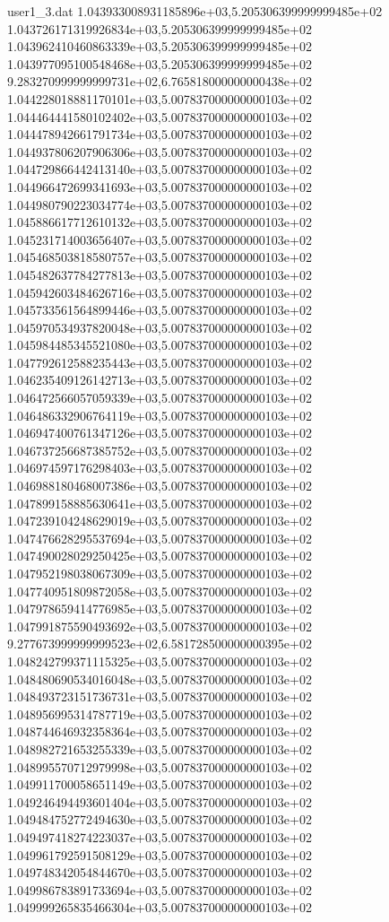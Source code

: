 \begin{filecontents}{user1_3.dat}
1.043933008931185896e+03,5.205306399999999485e+02
1.043726171319926834e+03,5.205306399999999485e+02
1.043962410460863339e+03,5.205306399999999485e+02
1.043977095100548468e+03,5.205306399999999485e+02
9.283270999999999731e+02,6.765818000000000438e+02
1.044228018881170101e+03,5.007837000000000103e+02
1.044464441580102402e+03,5.007837000000000103e+02
1.044478942661791734e+03,5.007837000000000103e+02
1.044937806207906306e+03,5.007837000000000103e+02
1.044729866442413140e+03,5.007837000000000103e+02
1.044966472699341693e+03,5.007837000000000103e+02
1.044980790223034774e+03,5.007837000000000103e+02
1.045886617712610132e+03,5.007837000000000103e+02
1.045231714003656407e+03,5.007837000000000103e+02
1.045468503818580757e+03,5.007837000000000103e+02
1.045482637784277813e+03,5.007837000000000103e+02
1.045942603484626716e+03,5.007837000000000103e+02
1.045733561564899446e+03,5.007837000000000103e+02
1.045970534937820048e+03,5.007837000000000103e+02
1.045984485345521080e+03,5.007837000000000103e+02
1.047792612588235443e+03,5.007837000000000103e+02
1.046235409126142713e+03,5.007837000000000103e+02
1.046472566057059339e+03,5.007837000000000103e+02
1.046486332906764119e+03,5.007837000000000103e+02
1.046947400761347126e+03,5.007837000000000103e+02
1.046737256687385752e+03,5.007837000000000103e+02
1.046974597176298403e+03,5.007837000000000103e+02
1.046988180468007386e+03,5.007837000000000103e+02
1.047899158885630641e+03,5.007837000000000103e+02
1.047239104248629019e+03,5.007837000000000103e+02
1.047476628295537694e+03,5.007837000000000103e+02
1.047490028029250425e+03,5.007837000000000103e+02
1.047952198038067309e+03,5.007837000000000103e+02
1.047740951809872058e+03,5.007837000000000103e+02
1.047978659414776985e+03,5.007837000000000103e+02
1.047991875590493692e+03,5.007837000000000103e+02
9.277673999999999523e+02,6.581728500000000395e+02
1.048242799371115325e+03,5.007837000000000103e+02
1.048480690534016048e+03,5.007837000000000103e+02
1.048493723151736731e+03,5.007837000000000103e+02
1.048956995314787719e+03,5.007837000000000103e+02
1.048744646932358364e+03,5.007837000000000103e+02
1.048982721653255339e+03,5.007837000000000103e+02
1.048995570712979998e+03,5.007837000000000103e+02
1.049911700058651149e+03,5.007837000000000103e+02
1.049246494493601404e+03,5.007837000000000103e+02
1.049484752772494630e+03,5.007837000000000103e+02
1.049497418274223037e+03,5.007837000000000103e+02
1.049961792591508129e+03,5.007837000000000103e+02
1.049748342054844670e+03,5.007837000000000103e+02
1.049986783891733694e+03,5.007837000000000103e+02
1.049999265835466304e+03,5.007837000000000103e+02

\end{filecontents}
